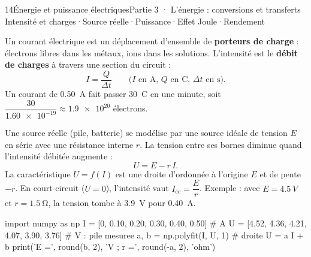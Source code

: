 \begin{ouverture}[piles]{14}{Énergie et puissance électriques}{Partie 3 · L'énergie : conversions et transferts}
{Intensité et charges\enspace·\enspace Source réelle\enspace·\enspace Puissance\enspace·\enspace Effet Joule\enspace·\enspace Rendement}
\end{ouverture}
\essentiel
{}
\begin{definition}
Un courant électrique est un déplacement d'ensemble de \textbf{porteurs de charge} : électrons libres dans les métaux, ions dans les
solutions. L'intensité est le \textbf{débit de charges} à travers une section du circuit :
\[I=\frac{Q}{\Delta t}\qquad\text{($I$ en A, $Q$ en C, $\Delta t$ en s).}\]
Un courant de \qty{0,50}{A} fait passer \qty{30}{C} en une minute, soit $\dfrac{30}{\num{1,60e-19}}\approx\num{1,9e20}$ électrons.
\end{definition}
\begin{loi}
Une source réelle (pile, batterie) se modélise par une source idéale de tension $E$ en série avec une résistance interne $r$. La
tension entre ses bornes diminue quand l'intensité débitée augmente :
\[U=E-r\,I.\]
La caractéristique $U=f(I)$ est une droite d'ordonnée à l'origine $E$ et de pente $-r$. En court-circuit ($U=0$), l'intensité vaut $I_\mathrm{cc}=\dfrac{E}{r}$.
Exemple : avec $E=\qty{4,5}{V}$ et $r=\qty{1,5}{\ohm}$, la tension tombe à \qty{3,9}{V} pour \qty{0,40}{A}.
\end{loi}
\par{}
\begin{python}
import numpy as np
I = [0, 0.10, 0.20, 0.30, 0.40, 0.50]         # A
U = [4.52, 4.36, 4.21, 4.07, 3.90, 3.76]      # V : pile mesuree
a, b = np.polyfit(I, U, 1)                    # droite U = a I + b
print('E =', round(b, 2), 'V ; r =', round(-a, 2), 'ohm')
\end{python}
